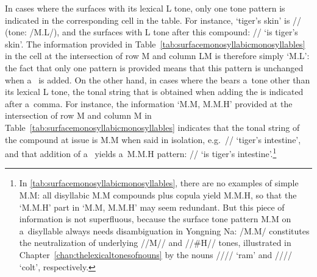  \newpage 
In cases where the  surfaces with its lexical L tone, only one tone pattern is indicated in the corresponding cell in the table. For instance, ‘tiger’s skin’ is // (tone: /M.L/), and the  surfaces with L tone after this compound: // ‘is tiger’s skin’. The information provided in Table~\ref{tab:surfacemonosyllabicmonosyllables} in the cell at the intersection of row M and column LM is therefore simply ‘M.L’: the fact that only one pattern is provided means that this pattern is unchanged when a~ is added. On the other hand, in cases where the  bears a~tone other than its lexical L tone, the tonal string that is obtained when adding the  is indicated after a~comma. For instance, the information ‘M.M, M.M.H’ provided at the intersection of row M and column M in Table~\ref{tab:surfacemonosyllabicmonosyllables} indicates that the tonal string of the
compound at issue is M.M when said in isolation, e.g.~// ‘tiger’s intestine’, and that
addition of a~ yields a~M.M.H pattern: // ‘is tiger’s intestine’.\footnote{In \ref{tab:surfacemonosyllabicmonosyllables}, there are no examples of simple M.M: all disyllabic M.M compounds plus {copula} yield M.M.H, so that the ‘M.M.H’ part in ‘M.M, M.M.H’ may seem redundant. But this piece of information is not superfluous, because the surface tone pattern M.M on a~disyllable always needs disambiguation in Yongning Na: /M.M/ constitutes the {neutralization} of underlying \mbox{//M//} and \mbox{//\#H//} tones, illustrated in Chapter~\ref{chap:thelexicaltonesofnouns} by the nouns //// ‘ram’ and //// ‘colt’, respectively.}

